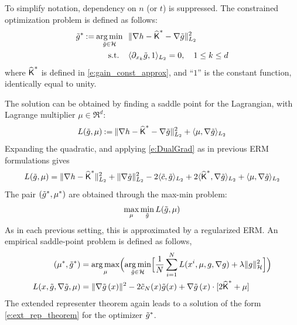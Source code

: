 To simplify notation, dependency on $n$ (or $t$) is suppressed. The constrained optimization problem is defined as follows:
\[
\begin{aligned}
\tilde g^*  \mathbin{:=} \mathop{\rm arg{\,}min}_{\tilde g\in{\cal H}} \ \  &   \| \nabla h - \widehat{\text{\sf K}}^* - \nabla \tilde g \|^2_{L_2} \\
\text{s.t. }  \ \   & \langle \partial_{x_k} \tilde g , 1 \rangle_{L_2} = 0, \quad     1\le  k \le d
\end{aligned}
\]
where $\widehat{\text{\sf K}}^*$ is defined in \eqref{e:gain_const_approx},  and ``$1$'' is the constant function, identically equal to unity.


The solution can be obtained by finding a saddle point for the Lagrangian,  with Lagrange multiplier $\mu  \in\Re^d$:
\begin{equation}
L(\tilg, \mu ) \eqdef   \| \nabla h - \hakFPF^* - \nabla \tilg \|^2_{L_2} +  \langle \mu ,  \nabla \tilg \rangle_{L_2}
\label{e:lag_dual}
\end{equation}
Expanding the quadratic, and applying \eqref{e:DualGrad} as in previous ERM formulations gives
\begin{equation}
L(\tilde g, \mu ) = \| \nabla h - \widehat{\text{\sf K}}^*\|_{L_2}^2 + \|\nabla \tilde g\|_{L_2}^2 - 2 \langle \tilde c, \tilde g \rangle_{L_2} + 2 \langle \widehat{\text{\sf K}}^*, \nabla \tilde g \rangle_{L_2} +  \langle \mu ,  \nabla \tilde g \rangle_{L_2}
\end{equation}
The pair $(\tilde g^*,\mu^*) $ are obtained through the max-min problem:
\begin{equation}
\max_\mu \min_{\tilde g}
L(\tilde g, \mu )
\end{equation}
As in each previous setting, this is approximated by a regularized ERM.
An empirical saddle-point problem is defined as follows,
\begin{equation}
\begin{aligned}
(\mu^* ,  \tilde g^*)  & =
\mathop{\rm arg{\,}max}_\mu  \Bigl(\mathop{\rm arg{\,}min}_{\tilde g \in {\cal H}} \Bigl[ \frac{1}{N} \sum_{i=1}^N  L(x^i,\mu, g,\nabla g) + \lambda \|g\|^2_{\cal H} \Bigr] \Bigr) \\
L(x,\tilde g,\nabla \tilde g, \mu)
&= \|\nabla \tilde g\, (x) \|^2    - 2   \tilde c_N(x)   \tilde g (x) +     \nabla \tilde g \, (x) \cdot [2 \widehat{\text{\sf K}}^*   + \mu]
\end{aligned}
\end{equation}
The extended representer theorem again leads to a solution of the form \eqref{e:ext_rep_theorem} for the optimizer $ \tilde g^*$.
